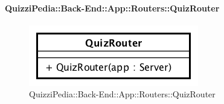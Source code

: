 \paragraph{QuizziPedia::Back-End::App::Routers::QuizRouter}
\label{QuizziPedia::Back-End::App::Routers::QuizRouter}
\begin{figure}[ht]
	\centering
	\includegraphics[scale=0.8]{UML/Classi/Back-End/QuizziPedia_Back-End_App_Routers_quizRouter.png}
	\caption{QuizziPedia::Back-End::App::Routers::QuizRouter}
\end{figure}
\FloatBarrier
